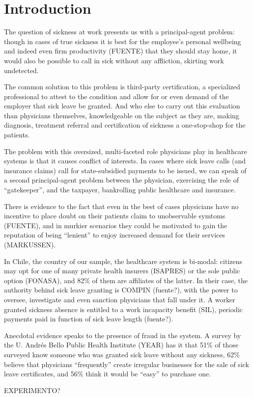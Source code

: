 \documentclass[../main.tex]{subfiles}
\begin{document}
\section{Introduction}

The question of sickness at work presents us with a principal-agent problem: though in cases of true sickness it is best for the employee's personal wellbeing and indeed even firm productivity (FUENTE) that they should stay home, it would also be possible to call in sick without any affliction, skirting work undetected.

The common solution to this problem is third-party certification, a specialized professional to attest to the condition and allow for or even demand of the employer that sick leave be granted. And who else to carry out this evaluation than physicians themselves, knowledgeable on the subject as they are, making diagnosis, treatment referral and certification of sickness a one-stop-shop for the patients.

The problem with this oversized, multi-faceted role physicians play in healthcare systems is that it causes conflict of interests. In cases where sick leave calls (and insurance claims) call for state-subsidied payments to be issued, we can speak of a second principal-agent problem between the physician, exercising the role of ``gatekeeper'', and the taxpayer, bankrolling public healthcare and insurance.

There is evidence to the fact that even in the best of cases physicians have no incentive to place doubt on their patients claim to unobservable symtoms (FUENTE), and in murkier scenarios they could be motivated to gain the reputation of being ``lenient'' to enjoy increased demand for their services (MARKUSSEN).

In Chile, the country of our sample, the healthcare system is bi-modal: citizens may opt for one of many private health insurers (ISAPRES) or the sole public option (FONASA), and 82\% of them are affiliates of the latter. In their case, the authority behind sick leave granting is COMPIN (fuente?), with the power to oversee, investigate and even sanction physicians that fall under it. A worker granted sickness absence is entitled to a work incapacity benefit (SIL), periodic payments paid in function of sick leave length (fuente?).

Anecdotal evidence speaks to the presence of fraud in the system. A survey by the U. Andrés Bello Public Health Institute (YEAR) has it that 51\% of those surveyed know someone who was granted sick leave without any sickness, 62\% believe that physicians ``frequently'' create irregular businesses for the sale of sick leave certificates, and 56\% think it would be ``easy'' to purchase one.

EXPERIMENTO?
\end{document}
